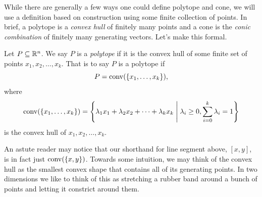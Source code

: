 \documentclass[12pt,oneside]{../../sfsuthesis}
\begin{document}
While there are generally a few ways one could define polytope and cone, we will use a definition based on construction using some finite collection of points.
In brief, a polytope is a \emph{convex hull} of finitely many points and a cone is the \emph{conic combination} of finitely many generating vectors.
Let's make this formal.
\begin{definition}[Polytope]\label{def:polytope}
    Let \( P \subseteq \mathbb{R}^n \).
    We say \( P \) is a \emph{polytope} if it is the convex hull of some finite set of points \( x_1, x_2, \dots, x_k \).
    That is to say \( P \) is a polytope if
    \[
        P = \operatorname{conv}(\{x_1, \dots, x_k\}),
    \]
    where
    \[
        \operatorname{conv}(\{x_1, \dots, x_k\}) = \left\{ \lambda_1 x_1 + \lambda_2 x_2 + \cdots + \lambda_k x_k \; \middle| \; \lambda_i \geq 0, \sum_{i=0}^k \lambda_i = 1 \right\}
    \]
    is the convex hull of \( x_1, x_2, \dots, x_k \).
\end{definition}
An astute reader may notice that our shorthand for line segment above, \( [x, y] \), is in fact just \( \operatorname{conv}(\{x,y\}) \).
Towards some intuition, we may think of the convex hull as the smallest convex shape that contains all of its generating points.
In two dimensions we like to think of this as stretching a rubber band around a bunch of points and letting it constrict around them.
\end{document}
